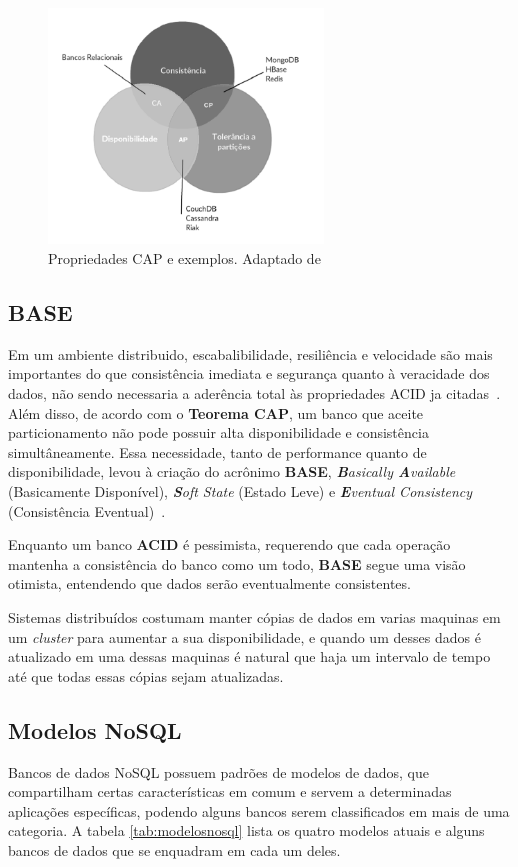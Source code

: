 \begin{figure}[!htb]
\centering
\includegraphics[width=0.65\textwidth]{figuras/cappb.png}
\caption{Propriedades CAP e exemplos. Adaptado de ~\cite{blograshid}}
\label{fig:capnosql}
\end{figure}

\subsection{BASE}
    Em um ambiente distribuido, escabalibilidade, resiliência e velocidade são mais importantes do que consistência imediata e segurança quanto à veracidade dos  dados, não sendo necessaria a aderência total às propriedades ACID ja citadas~\cite{neo4j_acidbase}. Além disso, de acordo com o \textbf{Teorema CAP}, um banco que aceite particionamento não pode possuir alta disponibilidade e consistência simultâneamente. Essa necessidade, tanto de performance quanto de disponibilidade, levou à criação do acrônimo \textbf{BASE}, \emph{\textbf{B}asically \textbf{A}vailable} (Basicamente Disponível), \emph{\textbf{S}oft State} (Estado Leve) e \emph{\textbf{E}ventual Consistency} (Consistência Eventual)~\cite{foxcluster}. 
    
    Enquanto um banco \textbf{ACID} é pessimista, requerendo que cada operação mantenha a consistência do banco como um todo, \textbf{BASE} segue uma visão otimista, entendendo que dados serão eventualmente consistentes.
    
    Sistemas distribuídos costumam manter cópias de dados em varias maquinas em um \emph{cluster} para aumentar a sua disponibilidade, e quando um desses dados é atualizado em uma dessas maquinas é natural que haja um intervalo de tempo até que todas essas cópias sejam atualizadas.

\subsection{Modelos NoSQL}
Bancos de dados NoSQL possuem padrões de modelos de dados, que compartilham certas características em comum e servem a determinadas aplicações específicas, podendo alguns bancos serem classificados em mais de uma categoria. A tabela \ref{tab:modelosnosql} lista os quatro modelos atuais e alguns bancos de dados que se enquadram em cada um deles.

